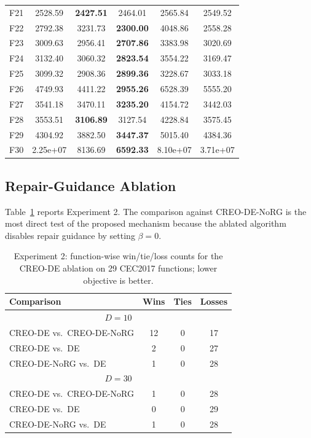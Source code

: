 \documentclass[journal]{IEEEtran}
\begin{document}
\begin{table}[t]
{\begin{tabular}{lccccc}
F21 & 2528.59 & \textbf{2427.51} & 2464.01 & 2565.84 & 2549.52 \\
F22 & 2792.38 & 3231.73 & \textbf{2300.00} & 4048.86 & 2558.28 \\
F23 & 3009.63 & 2956.41 & \textbf{2707.86} & 3383.98 & 3020.69 \\
F24 & 3132.40 & 3060.32 & \textbf{2823.54} & 3554.22 & 3169.47 \\
F25 & 3099.32 & 2908.36 & \textbf{2899.36} & 3228.67 & 3033.18 \\
F26 & 4749.93 & 4411.22 & \textbf{2955.26} & 6528.39 & 5555.20 \\
F27 & 3541.18 & 3470.11 & \textbf{3235.20} & 4154.72 & 3442.03 \\
F28 & 3553.51 & \textbf{3106.89} & 3127.54 & 4228.84 & 3575.45 \\
F29 & 4304.92 & 3882.50 & \textbf{3447.37} & 5015.40 & 4384.36 \\
F30 & 2.25e+07 & 8136.69 & \textbf{6592.33} & 8.10e+07 & 3.71e+07 \\
\bottomrule
\end{tabular}}
\end{table}

\clearpage

\subsection{Repair-Guidance Ablation}
\label{sec:ablation}

Table~\ref{tab:ablation} reports Experiment 2. The comparison against CREO-DE-NoRG is the most direct test of the proposed mechanism because the ablated algorithm disables repair guidance by setting $\beta=0$.

\begin{table}[H]
\centering
\caption{Experiment 2: function-wise win/tie/loss counts for the CREO-DE ablation on 29 CEC2017 functions; lower objective is better.}
\label{tab:ablation}
\small
\begin{tabular}{lccc}
\toprule
Comparison & Wins & Ties & Losses\\
\midrule
\multicolumn{4}{c}{$D=10$}\\
CREO-DE vs.\ CREO-DE-NoRG & 12 & 0 & 17\\
CREO-DE vs.\ DE            & 2  & 0 & 27\\
CREO-DE-NoRG vs.\ DE       & 1  & 0 & 28\\
\midrule
\multicolumn{4}{c}{$D=30$}\\
CREO-DE vs.\ CREO-DE-NoRG & 1  & 0 & 28\\
CREO-DE vs.\ DE            & 0  & 0 & 29\\
CREO-DE-NoRG vs.\ DE       & 1  & 0 & 28\\
\bottomrule
\end{tabular}
\end{table}
\end{document}

